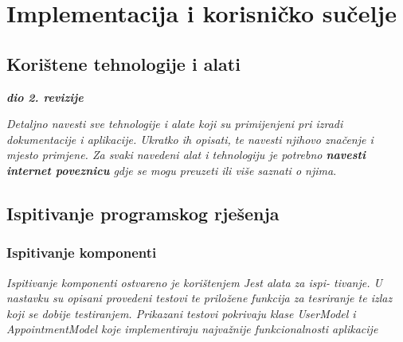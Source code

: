 \chapter{Implementacija i korisničko sučelje}
		
		
		\section{Korištene tehnologije i alati}
		
			\textbf{\textit{dio 2. revizije}}
			
			 \textit{Detaljno navesti sve tehnologije i alate koji su primijenjeni pri izradi dokumentacije i aplikacije. Ukratko ih opisati, te navesti njihovo značenje i mjesto primjene. Za svaki navedeni alat i tehnologiju je potrebno \textbf{navesti internet poveznicu} gdje se mogu preuzeti ili više saznati o njima}.
			
			
			\eject 
		
	
		\section{Ispitivanje programskog rješenja}
	
			
			\subsection{Ispitivanje komponenti}
			\textit{Ispitivanje komponenti ostvareno je korištenjem Jest alata za ispi-
                    tivanje. U nastavku su opisani provedeni testovi te priložene funkcija za tesriranje te izlaz koji se dobije testiranjem. Prikazani testovi pokrivaju klase UserModel i AppointmentModel koje implementiraju najvažnije funkcionalnosti aplikacije
                    }

